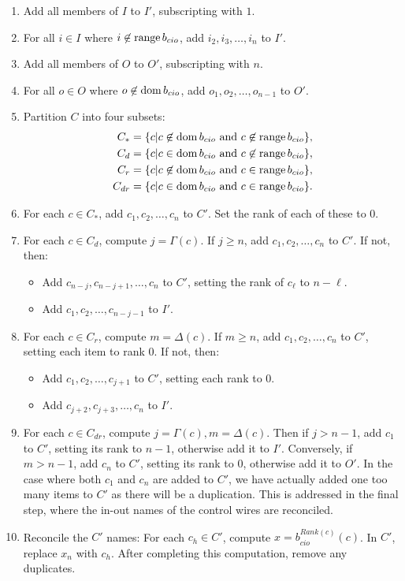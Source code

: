 \begin{enumerate}
  \item Add all members of $I$ to $I'$, subscripting with $1$.
  \item For all $i\in I$ where $i \not\in \operatorname*{range} b_{cio}$, add $i_2,i_3,\ldots,i_n$ to $I'$.
  \item Add all members of $O$ to $O'$, subscripting with $n$.
  \item For all $o\in O$ where $o \not\in \operatorname*{dom} b_{cio}$, add $o_1,o_2,\ldots,o_{n-1}$ to $O'$.
  \item Partition $C$ into four subsets:
  \begin{align*}
    C_*    &= \{c|c\not\in \operatorname*{dom} b_{cio}\text{ and }c\not\in \operatorname*{range} b_{cio}\},\\
    C_d    &= \{c|c\in \operatorname*{dom} b_{cio}\text{ and }c\not\in \operatorname*{range} b_{cio}\},\\
    C_r    &= \{c|c\not\in \operatorname*{dom} b_{cio}\text{ and }c\in \operatorname*{range} b_{cio}\},\\
    C_{dr} &= \{c|c\in \operatorname*{dom} b_{cio}\text{ and }c\in \operatorname*{range} b_{cio}\}.
  \end{align*}
  \item For each $c\in C_*$, add $c_1,c_2,\ldots,c_n$ to $C'$. Set the
    rank of each of these to $0$.
  \item For each $c\in C_d$, compute $j=\Gamma(c)$. If $j \ge n$, add
    $c_1,c_2,\ldots,c_n$ to $C'$. If not, then:
    \begin{itemize}
      \item Add $c_{n-j},c_{n-j+1},\ldots,c_n$ to $C'$, setting the
        rank of $c_\ell$ to $n-\ell$.
      \item Add $c_1,c_2,\ldots,c_{n-j-1}$ to $I'$.
    \end{itemize}
  \item For each $c\in C_r$, compute $m=\Delta(c)$. If $m \ge n$, add
    $c_1,c_2,\ldots,c_n$ to $C'$, setting each item to rank $0$.
    If not, then:
    \begin{itemize}
      \item Add $c_1,c_2,\ldots,c_{j+1}$ to $C'$, setting each rank to $0$.
      \item Add $c_{j+2},c_{j+3},\ldots,c_{n}$ to $I'$.
    \end{itemize}
  \item For each $c\in C_{dr}$, compute $j=\Gamma(c), m=\Delta(c)$. Then
    if $j>n-1$, add $c_1$ to $C'$, setting its rank to $n-1$, otherwise
    add it to $I'$. Conversely, if $m>n-1$, add $c_n$ to $C'$, setting its
    rank to $0$, otherwise add it to $O'$. In the case
    where both $c_1$ and $c_n$ are added to $C'$, we have actually added
    one too many items to $C'$ as there will be a duplication. This is
    addressed in the final step, where the in-out names of the control
    wires are reconciled.
  \item Reconcile the $C'$ names: For each $c_h\in C'$, compute
    $x=b_{cio}^{Rank(c)}(c)$. In $C'$, replace $x_n$ with $c_h$. After
    completing this computation, remove any duplicates.
\end{enumerate}

